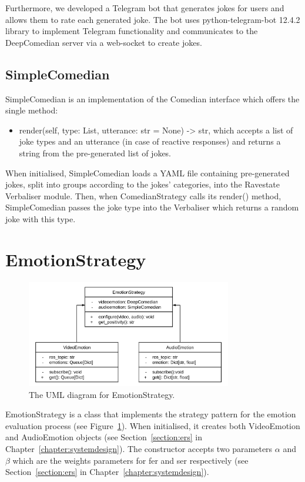 Furthermore, we developed a Telegram bot that generates jokes for users and allows them to rate each generated joke. The bot uses python-telegram-bot 12.4.2 library to implement Telegram functionality and communicates to the DeepComedian server via a web-socket to create jokes.

\subsection{SimpleComedian}

SimpleComedian is an implementation of the Comedian interface which offers the single method:
\begin{itemize}
    \item render(self, type: List, utterance: str = None) -> str, which accepts a list of joke types and an utterance (in case of reactive responses) and returns a string from the pre-generated list of jokes.
\end{itemize}

When initialised, SimpleComedian loads a YAML file containing pre-generated jokes, split into groups according to the jokes' categories, into the Ravestate Verbaliser module. Then, when ComedianStrategy calls its render() method, SimpleComedian passes the joke type into the Verbaliser which returns a random joke with this type.

\section{EmotionStrategy}\label{subsection:emostr}

\begin{figure}[htpb]
  \centering
  \includegraphics[width=0.8\textwidth]{figures/umlemostr.png}
  \caption{The UML diagram for EmotionStrategy.} \label{fig:umles}
\end{figure}

EmotionStrategy is a class that implements the strategy pattern for the emotion evaluation process (see Figure~\ref{fig:umles}). When initialised, it creates both VideoEmotion and AudioEmotion objects (see Section~\ref{section:ers} in Chapter~\ref{chapter:systemdesign}). The constructor accepts two parameters \( \alpha\) and \( \beta\) which are the weights parameters for \acrshort{fer} and \acrshort{ser} respectively (see Section~\ref{section:ers} in Chapter~\ref{chapter:systemdesign}).

